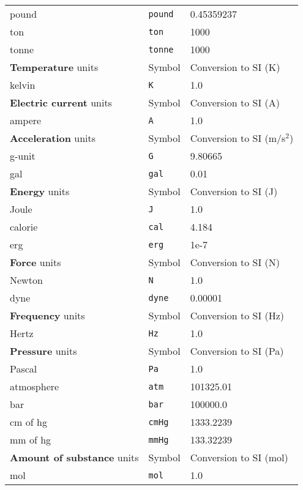\documentclass[a4paper,10pt]{article}
\begin{document}
\begin{center}
\begin{tabular}{lll}
     pound          &\texttt{pound} &      0.45359237\\
     ton            &\texttt{ton} &        1000\\
     tonne          &\texttt{tonne} &      1000\\
\hline
{\bf Temperature} units & Symbol & Conversion to SI (K)\\
\hline
     kelvin         &\texttt{K} &          1.0\\
\hline
{\bf Electric current} units & Symbol & Conversion to SI (A)\\
\hline
     ampere         &\texttt{A} &          1.0\\
\hline
{\bf Acceleration} units & Symbol & Conversion to SI (m/s$^2$)\\
\hline
    g-unit              &\texttt{G} &   9.80665\\
    gal                 &\texttt{gal} &     0.01\\
\hline  
{\bf Energy} units & Symbol & Conversion to SI (J)\\
\hline
     Joule               &\texttt{J} &       1.0\\
     calorie             &\texttt{cal} &     4.184\\
     erg                 &\texttt{erg} &     1e-7\\
\hline
{\bf Force} units & Symbol & Conversion to SI (N)\\
\hline
     Newton              &\texttt{N} &       1.0 \\
     dyne                &\texttt{dyne} &    0.00001 \\
\hline
{\bf Frequency} units & Symbol & Conversion to SI (Hz)\\
\hline
     Hertz              &\texttt{Hz} &       1.0 \\
\hline
{\bf Pressure} units & Symbol & Conversion to SI (Pa)\\
\hline
     Pascal              &\texttt{Pa} &           1.0 \\
     atmosphere          &\texttt{atm} &     101325.01 \\
     bar                 &\texttt{bar} &     100000.0 \\
     cm of hg            &\texttt{cmHg} &      1333.2239 \\
     mm of hg            &\texttt{mmHg} &       133.32239 \\
\hline
{\bf Amount of substance} units & Symbol & Conversion to SI
(mol)\\
\hline
     mol              &\texttt{mol} &           1.0 \\
\hline
\end{tabular}
\end{center}
\normalfont
\end{document}
